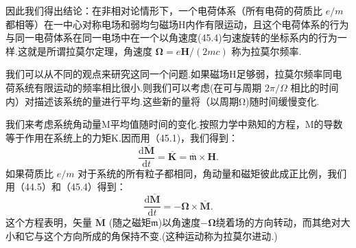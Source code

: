 因此我们得出结论：在非相对论情形下，一个电荷体系（所有电荷的荷质比 $e/m$ 都相等）在一中心对称电场和弱均匀磁场H内作有限运动，且这个电荷体系的行为与同一电荷体系在同一电场中在一个以角速度(45.4)匀速旋转的坐标系内的行为一样.这就是所谓拉莫尔定理，角速度 $\boldsymbol{\Omega}=e\boldsymbol{H}/(2mc)$ 称为拉莫尔频率.

我们可以从不同的观点来研究这同一个问题.如果磁场H足够弱，拉莫尔频率同电荷系统有限运动的频率相比很小.则我们可以考虑(在可与周期 $2\pi/\Omega$ 相比的时间内）对描述该系统的量进行平均.这些新的量将（以周期Ω)随时间缓慢变化.

我们来考虑系统角动量M平均值随时间的变化.按照力学中熟知的方程，M的导数等于作用在系统上的力矩K.因而用（45.1)，我们得到：
\begin{equation*}
  \frac{\mathrm{d}\overline{\boldsymbol{M}}}{\mathrm{d}t}
  =\overline{\boldsymbol{K}}=\overline{\mathfrak{m}}\times\boldsymbol{H}.
\end{equation*}
如果荷质比 $e/m$ 对于系统的所有粒子都相同，角动量和磁矩彼此成正比例，我们用（44.5）和（45.4）得到：
\begin{equation}
  \frac{\mathrm{d}\overline{\boldsymbol{M}}}{\mathrm{d}t}
  =-\boldsymbol{\Omega}\times\overline{\boldsymbol{M}}.
\end{equation}
这个方程表明，矢量 $\overline{\boldsymbol{M}}$ (随之磁矩$\mathfrak{m}$)以角速度$-\boldsymbol{\Omega}$绕着场的方向转动，而其绝对大小和它与这个方向所成的角保持不变.(这种运动称为拉莫尔进动.)
